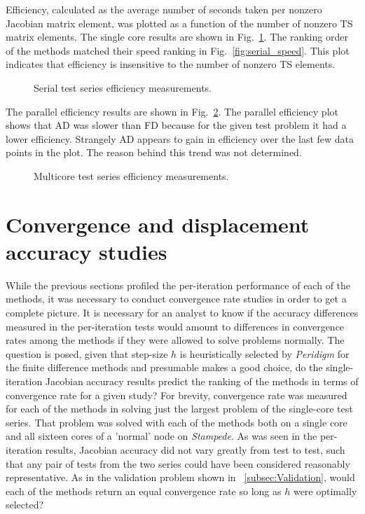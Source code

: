 \documentclass[preprint,12pt]{elsarticle}
\begin{document}
Efficiency, calculated as the average number of seconds taken per nonzero Jacobian matrix element, was plotted as a function of the number of nonzero TS matrix elements. The single core results are shown in Fig.~\ref{fig:serial_efficiency}.  The ranking order of the methods
matched their speed ranking in Fig.~\ref{fig:serial_speed}. This plot indicates that efficiency is insensitive to the number of nonzero TS elements.  
%
\begin{figure}[tbp]
  \centering
  \scalebox{1.0}{}
  \caption{Serial test series efficiency measurements.}
  \label{fig:serial_efficiency}
\end{figure}
%
The parallel efficiency results are shown in Fig.~\ref{fig:multi_efficiency}. The parallel efficiency plot shows that AD was slower than FD because for the given test problem it had a lower efficiency. Strangely AD appears to gain in efficiency over the last few data points in the plot. The reason behind this trend was not determined.
%
\begin{figure}[tbp]
  \centering
  \scalebox{1.0}{}
  \caption{Multicore test series efficiency measurements.}
  \label{fig:multi_efficiency}
\end{figure}



\section{Convergence and displacement accuracy studies} 
\label{sec:PeridigmConvergenceStudy}
%
While the previous sections profiled the per-iteration performance of each of
the methods, it was necessary to conduct convergence rate studies in order to
get a complete picture. It is necessary for an analyst to know if the
accuracy differences measured in the per-iteration tests would amount to
differences in convergence rates among the methods if they were allowed to solve problems
normally. The question is posed, given that step-size $h$ is heuristically
selected by \emph{Peridigm} for the finite difference methods and presumable
makes a good choice, do the single-iteration Jacobian accuracy results predict
the ranking of the methods in terms of convergence rate for a given study? For
brevity, convergence rate was measured for each of the methods in solving just
the largest problem of the single-core test series. That problem was solved with each of the methods
both on a single core and all sixteen cores of a 'normal' node on \emph{Stampede}. As was seen in the per-iteration results,
Jacobian accuracy did not vary greatly from test to test, such that any pair of tests
from the two series could have been considered reasonably representative. As in
the validation problem shown in ~\ref{subsec:Validation}, would each of the methods return an
equal convergence rate so long as $h$ were optimally selected? 
\end{document}
